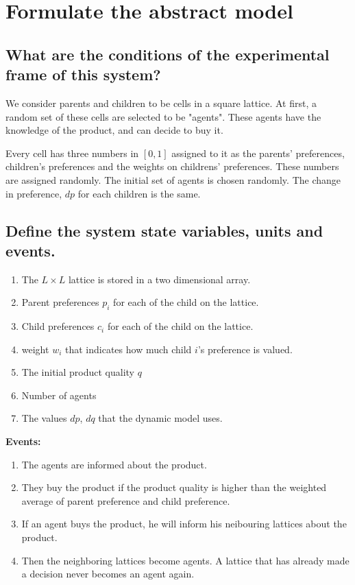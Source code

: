 \documentclass[article, 11pt, a4paper, onesize]{memoir}
\begin{document}
\section{Formulate the abstract model}

\subsection{What are the conditions of the experimental frame of this system?}

We consider parents and children to be cells in a square lattice. At first, a random set
of these cells are selected to be "agents". These agents have the knowledge of the
product, and can decide to buy it. 

Every cell has three numbers in \([0,1]\) assigned to it as the parents' preferences,
children's preferences and the weights on childrens' preferences. These numbers are
assigned randomly. The initial set of agents is chosen randomly. The change in
preference, \(dp\) for each children is the same.

\subsection{Define the system state variables, units and events.}

\begin{enumerate}
	\item The \(L\times L\) lattice is stored in a two dimensional array.
    \item Parent preferences \(p_i\) for each of the child on the lattice.
    \item Child preferences \(c_i\) for each of the child on the lattice.
    \item weight \(w_i\) that indicates how much child $i$'s preference is valued.
    \item The initial product quality \(q\)
	\item Number of agents
    \item The values \(dp\), \(dq\) that the dynamic model uses.
\end{enumerate}

\textbf{Events:}
\begin{enumerate}
	\item The agents are informed about the product.
    \item They buy the product if the product quality is higher than the weighted average
        of parent preference and child preference.
    \item If an agent buys the product, he will inform his neibouring lattices about the
        product. 
    \item Then the neighboring lattices become agents. A lattice that has already made a
        decision never becomes an agent again.
\end{enumerate}
\end{document}
